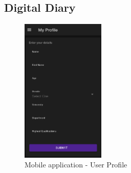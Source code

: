 \subsection{Digital Diary}
\begin{figure}
\begin{center}
  \includegraphics[width=150]{images/profile.png}
\end{center}
\caption{\label{fig:app-profile} Mobile application - User Profile}
\end{figure}
